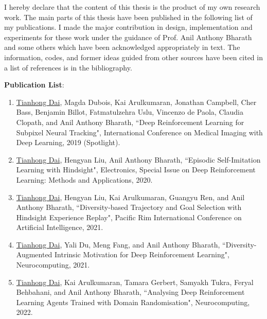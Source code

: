 
\cleardoublepage

\begin{dedication}
I hereby declare that the content of this thesis is the product of my own research work. The main parts of this thesis have been published in the following list of my publications. I made the major contribution in design, implementation and experiments for these work under the guidance of Prof. Anil Anthony Bharath and some others which have been acknowledged appropriately in text. The information, codes, and former ideas guided from other sources have been cited in a list of references is in the bibliography.
\end{dedication}
\textbf{Publication List}:
\begin{enumerate}
	\item \underline{Tianhong Dai}, Magda Dubois, Kai Arulkumaran, Jonathan Campbell, Cher Bass, Benjamin Billot, Fatmatulzehra Uslu, Vincenzo de Paola, Claudia Clopath, and Anil Anthony Bharath, ``Deep Reinforcement Learning for Subpixel Neural Tracking", International Conference on Medical Imaging with Deep Learning, 2019 (Spotlight).
	\item \underline{Tianhong Dai}, Hengyan Liu, Anil Anthony Bharath, ``Episodic Self-Imitation Learning with Hindsight", Electronics, Special Issue on Deep Reinforcement Learning: Methods and Applications, 2020.
	\item \underline{Tianhong Dai}, Hengyan Liu, Kai Arulkumaran, Guangyu Ren, and Anil Anthony Bharath, ``Diversity‐based Trajectory and Goal Selection with Hindsight Experience Replay", Pacific Rim International Conference on Artificial Intelligence, 2021.
	\item \underline{Tianhong Dai}, Yali Du, Meng Fang, and Anil Anthony Bharath, ``Diversity-Augmented Intrinsic Motivation for Deep Reinforcement Learning", Neurocomputing, 2021.
	\item \underline{Tianhong Dai}, Kai Arulkumaran, Tamara Gerbert, Samyakh Tukra, Feryal Behbahani, and Anil Anthony Bharath, ``Analysing Deep Reinforcement Learning Agents Trained with Domain Randomisation", Neurocomputing, 2022.
\end{enumerate}

